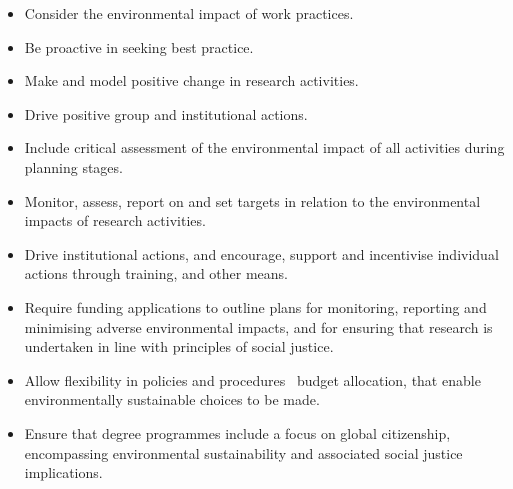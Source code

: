 \documentclass[../SustainableHEP.tex]{subfiles}
\begin{document}
\clearpage
\begin{minipage}{\textwidth}
\begin{reco2}{\currentname}
{
\begin{itemize}[leftmargin=6 mm]
\item Consider the environmental impact of work practices.

\item Be proactive in seeking best practice.

\item Make and model positive change in research activities.

\item Drive positive group and institutional actions.
\end{itemize}
}
{
\begin{itemize}[leftmargin=6 mm]
\item  Include critical assessment of the environmental impact of all activities during planning stages.

\item  Monitor, assess, report on and set targets in relation to the environmental impacts of research activities.

%
\item Drive institutional actions, and encourage, support and incentivise individual actions through training, and other means.
%
\end{itemize}
}
{
\begin{itemize}[leftmargin=6 mm]
%

\item Require funding applications to outline plans for monitoring, reporting and minimising adverse environmental impacts, and for ensuring that research is undertaken in line with principles of social justice.

\item Allow flexibility in policies and procedures \eg\ budget allocation, that enable environmentally sustainable choices to be made.

\item Ensure that degree programmes include a focus on global citizenship, encompassing environmental sustainability and associated social justice implications.


\end{itemize}}
\end{reco2}
\end{minipage}
\end{document}
